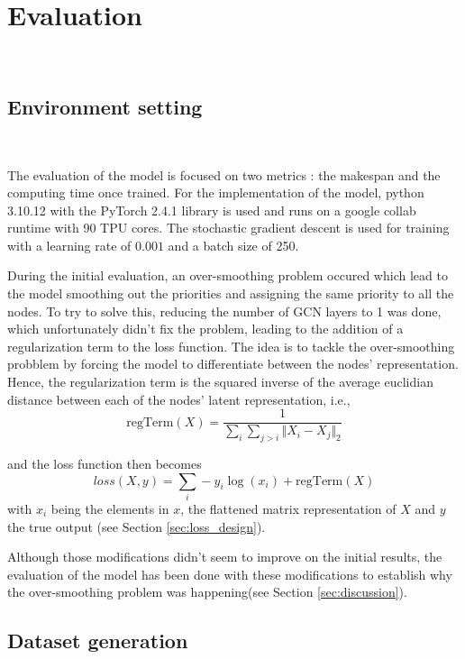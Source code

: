 \section{Evaluation}
~

\subsection{Environment setting}
~

The evaluation of the model is focused on two metrics : the makespan and the computing time once trained.
For the implementation of the model, python 3.10.12 with the PyTorch 2.4.1 library is used and runs on a google collab runtime
with 90 TPU cores.
The stochastic gradient descent is used for training with a learning rate of $0.001$ and a batch size of 250.

During the initial evaluation, an over-smoothing problem\cite{chen2020oversmoothing} occured which lead to 
the model smoothing out the priorities and assigning the same priority to all the nodes.
To try to solve this, reducing the number of GCN layers to 1 was done,
which unfortunately didn't fix the problem, leading to the addition
of a regularization term to the loss function.
The idea is to tackle the over-smoothing probblem by forcing the model
to differentiate between the nodes' representation.
Hence, the regularization term is the squared inverse of the average euclidian distance 
between each of the nodes' latent representation, i.e., 
\begin{equation}
    \text{regTerm}(X) = \frac{1}{\sum_{i}\sum_{j > i} \Vert X_i - X_j\Vert_{2} }
\end{equation}
    
and the loss function then becomes
\begin{equation}
    loss(X, y) = \sum_{i} -y_i\log(x_i) + \text{regTerm}(X)
\end{equation}
with $x_i$ being the elements in $x$, the flattened matrix representation of $X$
and $y$ the true output (see Section \ref{sec:loss_design}).

Although those modifications didn't seem to improve on the initial results,
the evaluation of the model has been done with these modifications
to establish why the over-smoothing problem was happening(see Section \ref{sec:discussion}).

\subsection{Dataset generation}
~

